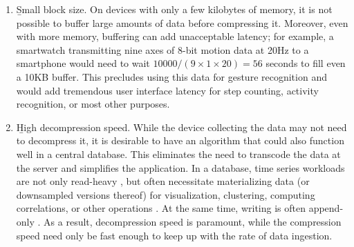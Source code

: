 \begin{enumerate}
\item \b{Small block size}. On devices with only a few kilobytes of memory, it is not possible to buffer large amounts of data before compressing it. Moreover, even with more memory, buffering can add unacceptable latency; for example, a smartwatch transmitting nine axes of 8-bit motion data at 20Hz to a smartphone would need to wait $10000 / (9 \times 1 \times 20) = 56$ seconds to fill even a 10KB buffer. This precludes using this data for gesture recognition and would add tremendous user interface latency for step counting, activity recognition, or most other purposes.
\item \b{High decompression speed}. While the device collecting the data may not need to decompress it, it is desirable to have an algorithm that could also function well in a central database. This eliminates the need to transcode the data at the server and simplifies the application. In a database, time series workloads are not only read-heavy \cite{respawnDB, berkeleyTreeDB, influxDB}, but often necessitate materializing data (or downsampled versions thereof) for visualization, clustering, computing correlations, or other operations \cite{respawnDB}. At the same time, writing is often append-only \cite{gorilla, respawnDB}. As a result, decompression speed is paramount, while the compression speed need only be fast enough to keep up with the rate of data ingestion.

\end{enumerate}

